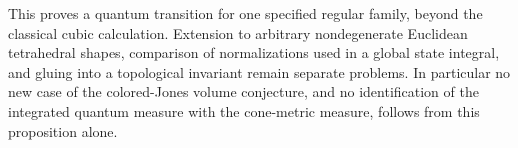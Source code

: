 This proves a quantum transition for one specified regular
family, beyond the classical cubic calculation. Extension
to arbitrary nondegenerate Euclidean tetrahedral shapes,
comparison of normalizations used in a global state integral,
and gluing into a topological invariant remain separate
problems. In particular no new case of the colored-Jones
volume conjecture, and no identification of the integrated
quantum measure with the cone-metric measure, follows from
this proposition alone.

